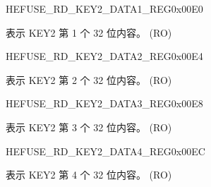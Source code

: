 \begin{register}{H}{EFUSE\_RD\_KEY2\_DATA1\_REG}{0x00E0}\label{regdesc:EFUSERDKEY2DATA1REG}
%
\regnewline%
\begin{regdesc}\begin{reglist}
\label{fielddesc:EFUSEKEY2DATA1}\item [EFUSE\_KEY2\_DATA1] 表示 KEY2 第 1 个 32 位内容。 (RO)
\end{reglist}\end{regdesc}
\end{register}


\begin{register}{H}{EFUSE\_RD\_KEY2\_DATA2\_REG}{0x00E4}\label{regdesc:EFUSERDKEY2DATA2REG}
%
\regnewline%
\begin{regdesc}\begin{reglist}
\label{fielddesc:EFUSEKEY2DATA2}\item [EFUSE\_KEY2\_DATA2] 表示 KEY2 第 2 个 32 位内容。 (RO)
\end{reglist}\end{regdesc}
\end{register}


\begin{register}{H}{EFUSE\_RD\_KEY2\_DATA3\_REG}{0x00E8}\label{regdesc:EFUSERDKEY2DATA3REG}
%
\regnewline%
\begin{regdesc}\begin{reglist}
\label{fielddesc:EFUSEKEY2DATA3}\item [EFUSE\_KEY2\_DATA3] 表示 KEY2 第 3 个 32 位内容。 (RO)
\end{reglist}\end{regdesc}
\end{register}


\begin{register}{H}{EFUSE\_RD\_KEY2\_DATA4\_REG}{0x00EC}\label{regdesc:EFUSERDKEY2DATA4REG}
%
\regnewline%
\begin{regdesc}\begin{reglist}
\label{fielddesc:EFUSEKEY2DATA4}\item [EFUSE\_KEY2\_DATA4] 表示 KEY2 第 4 个 32 位内容。 (RO)
\end{reglist}\end{regdesc}
\end{register}


